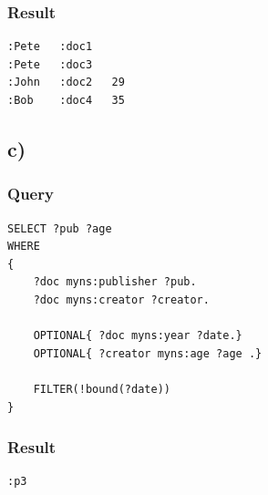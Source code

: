 \documentclass{article}
\begin{document}
\subsubsection*{Result}
\begin{lstlisting}
:Pete	:doc1	
:Pete	:doc3	
:John	:doc2	29
:Bob	:doc4	35
\end{lstlisting}


\subsection*{c)}
\subsubsection*{Query}
\begin{lstlisting}
SELECT ?pub ?age
WHERE
{
	?doc myns:publisher ?pub.
	?doc myns:creator ?creator.

	OPTIONAL{ ?doc myns:year ?date.}
	OPTIONAL{ ?creator myns:age ?age .}
	
	FILTER(!bound(?date))
}
\end{lstlisting}
\subsubsection*{Result}
\begin{lstlisting}
:p3
\end{lstlisting}


\vspace{2cm}
\end{document}
